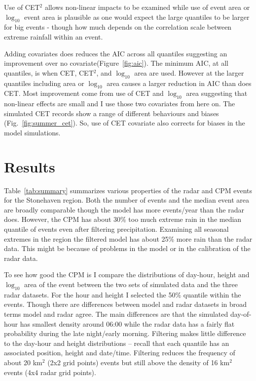 \documentclass[11pt,a4paper]{article}
\begin{document}
 
 Use of CET$^2$ allows non-linear impacts to be examined while use of  event area or $\log_{10}$ event area is plausible as one would expect the large quantiles to be larger for big events - though how much depends on the correlation scale between extreme rainfall within an event. 

Adding covariates does reduces the AIC across all quantiles suggesting an improvement over no covariate(Figure~\ref{fig:aic}). The minimum AIC, at all quantiles, is when CET, CET$^2$,  and $\log_{10}$ area are used. However at the larger quantiles including area or $\log_{10}$ area causes a larger reduction in AIC than does CET.  Most improvement come from use of CET and $\log_{10}$ area suggesting that non-linear effects are small and I use those two covariates from here on. 
The simulated CET records show a range of different behaviours and biases (Fig.~\ref{fig:summer_cet}). So, use of CET covariate also corrects for biases in the model simulations. 


\section{Results}

Table~\ref{tab:summary} summarizes various properties of the radar and CPM events for the Stonehaven region.  Both the number of events and the median event area are broadly comparable though the model has more events/year than the radar does.  However, the CPM has about 30\% too much extreme rain in the median quantile of events even after filtering precipitation. Examining  all seasonal extremes in the region the filtered model has about 25\% more rain than the radar data.  This might be because of problems in the model or in the calibration of the radar data. 

To see how good the CPM is I compare the distributions of  day-hour, height and  $\log_{10}$ area of the event between the two sets of simulated data and the three radar datasets. For the hour and height I selected the 50\% quantile within the events. Though there are differences between model and radar datasets in broad terms model and radar agree. The main differences are that the simulated day-of-hour has smallest density around 06:00 while the radar data has a fairly flat probability during the late night/early morning. Filtering makes little difference to the day-hour and height distributions -- recall that each quantile has an associated position, height and date/time. Filtering reduces the frequency of about 20 km$^2$ (2x2 grid points) events but still above the density of 16 km$^2$ events (4x4 radar grid points). 
\end{document}
